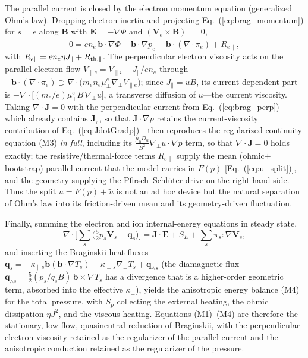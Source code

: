 \documentclass[english]{article}
\newcommand{\bB}{\mathbf{B}}
\newcommand{\bJ}{\mathbf{J}}
\newcommand{\bb}{\mathbf{b}}
\newcommand{\bE}{\mathbf{E}}
\newcommand{\bV}{\mathbf{V}}
\newcommand{\gradperp}{\nabla_{\!\perp}}
\begin{document}
The parallel current is closed by the electron momentum equation (generalized Ohm's law). Dropping
electron inertia and projecting Eq.~(\ref{eq:brag_momentum}) for $s=e$ along $\bB$ with
$\bE=-\nabla\Phi$ and $(\bV_e\times\bB)_\parallel=0$,
\begin{equation}
0=e n_e\,\bb\cdot\nabla\Phi-\bb\cdot\nabla p_e
-\bb\cdot(\nabla\cdot\pi_e)+R_{e\parallel} ,
\label{eq:parallel_ohm}
\end{equation}
with $R_{e\parallel}=en_e\eta J_\parallel+R_{\rm th,\parallel}$. The perpendicular electron
viscosity acts on the parallel electron flow $V_{\parallel e}=V_{\parallel i}-J_\parallel/en_e$
through $-\bb\cdot(\nabla\cdot\pi_e)\supset\nabla\cdot\!\big(m_en_e\mu_\perp^e\gradperp
V_{\parallel e}\big)$; since $J_\parallel=uB$, its current-dependent part is
$-\nabla\cdot\!\big[(m_e/e)\mu_\perp^e B\,\gradperp u\big]$, a transverse diffusion of $u$---the
current viscosity. Taking $\nabla\cdot\bJ=0$ with the perpendicular current from
Eq.~(\ref{eq:brag_perp})---which already contains $\bJ_\pi$, so that $\bJ\cdot\nabla p$ retains the
current-viscosity contribution of Eq.~(\ref{eq:JdotGradp})---then reproduces the regularized
continuity equation (M3) \emph{in full}, including its
$\tfrac{\mu_0 D_u}{B^{2}}\gradperp u\cdot\nabla p$ term, so that $\nabla\cdot\bJ=0$ holds exactly;
the resistive/thermal-force terms $R_{e\parallel}$ supply the mean (ohmic$+$bootstrap) parallel
current that the model carries in $F(p)$ [Eq.~(\ref{eq:u_split})], and the geometry supplying the
Pfirsch--Schl\"uter drive on the right-hand side. Thus the split $u=F(p)+\tilde u$ is not an ad hoc
device but the natural separation of Ohm's law into its friction-driven mean and its
geometry-driven fluctuation.

Finally, summing the electron and ion internal-energy equations in steady state,
\begin{equation}
\nabla\cdot\Big[\sum_s\big(\tfrac52 p_s\bV_s+\mathbf{q}_s\big)\Big]
=\bJ\cdot\bE+S_E+\sum_s\pi_s\!:\!\nabla\bV_s ,
\label{eq:brag_energy}
\end{equation}
and inserting the Braginskii heat fluxes $\mathbf{q}_s=-\kappa_{\parallel s}\bb(\bb\cdot\nabla T_s)
-\kappa_{\perp s}\gradperp T_s+\mathbf{q}_{\wedge s}$ (the diamagnetic flux $\mathbf{q}_{\wedge s}
=\tfrac52(p_s/q_sB)\,\bb\times\nabla T_s$ has a divergence that is a higher-order geometric term,
absorbed into the effective $\kappa_\perp$), yields the anisotropic energy balance (M4) for the
total pressure, with $S_p$ collecting the external heating, the ohmic dissipation $\eta J^{2}$, and
the viscous heating. Equations (M1)--(M4) are therefore the stationary, low-flow, quasineutral
reduction of Braginskii, with the perpendicular electron viscosity retained as the regularizer of
the parallel current and the anisotropic conduction retained as the regularizer of the pressure.
\end{document}
